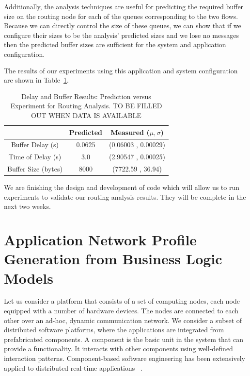 Additionally, the analysis techniques are useful for predicting the
required buffer size on the routing node for each of the queues
corresponding to the two flows.  Because we can directly control the
size of these queues, we can show that if we configure their sizes to
be the analysis' predicted sizes and we lose no messages then the
predicted buffer sizes are sufficient for the system and application
configuration.  
\fi

The results of our experiments using this application and system
configuration are shown in Table~\ref{table:routing_results}.

\begin{table}[htbp]
\caption{Delay and Buffer Results: Prediction versus Experiment for
  Routing Analysis. TO BE FILLED OUT WHEN DATA IS AVAILABLE}
\begin{tabular}{| c | c | c |}
\hline
 & Predicted & Measured ($\mu,\sigma$) \\\hline
Buffer Delay (s) & 0.0625 & (0.06003 , 0.00029) \\\hline
Time of Delay (s) & 3.0 & (2.90547 , 0.00025) \\\hline
Buffer Size (bytes) & 8000 & (7722.59 , 36.94) \\\hline
\end{tabular}
\label{table:routing_results}
\end{table}

We are finishing the design and development of code which will allow
us to run experiments to validate our routing analysis results.  They
will be complete in the next two weeks.



\iffalse

\newpage

\section{Application Network Profile Generation from Business Logic Models}
\label{sec:generation}

Let us consider a platform that consists of a set of computing nodes,
each node equipped with a number of hardware devices. The nodes are
connected to each other over an ad-hoc, dynamic communication network.
We consider a subset of distributed software platforms, where the
applications are integrated from prefabricated components. A component
is the basic unit in the system that can provide a functionality. It
interacts with other components using well-defined interaction
patterns. Component-based software engineering has been extensively
applied to distributed real-time applications
~\cite{Emb_SW_PECOS:02,RT_CIAO:04,PROGRESS_ICSEA:08,ACM_SPE:10,ISIS_F6_ISORC:13}.

